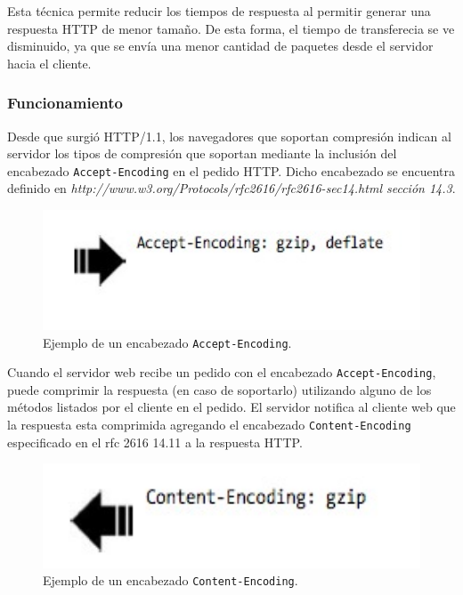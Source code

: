 \documentclass[a4paper,12pt]{report}
\begin{document}
Esta técnica permite reducir los tiempos de respuesta al permitir generar una respuesta HTTP de menor tamaño. De esta forma, el tiempo de transferecia se ve disminuido, ya que se envía
una menor cantidad de paquetes desde el servidor hacia el cliente.

\subsubsection{Funcionamiento}

Desde que surgió HTTP/1.1, los navegadores que soportan compresión indican al servidor los tipos de compresión que soportan mediante la inclusión del encabezado
\texttt{Accept-Encoding} en el pedido HTTP. Dicho encabezado se encuentra definido en \emph{http://www.w3.org/Protocols/rfc2616/rfc2616-sec14.html sección 14.3}.

\begin{figure}[h]
\centering
\includegraphics[width=1\textwidth]{figuras/hpws/accept-encoding.jpg}
  \caption{Ejemplo de un encabezado \texttt{Accept-Encoding}.}
    \label{fig.gzip-request}
\end{figure}

Cuando el servidor web recibe un pedido con el encabezado \texttt{Accept-Encoding}, puede comprimir la respuesta (en caso de soportarlo) utilizando alguno de los métodos listados
por el cliente en el pedido. El servidor notifica al cliente web que la respuesta esta comprimida agregando el encabezado \texttt{Content-Encoding} especificado en el rfc 2616
\cite{rfc2616} 14.11 a la respuesta HTTP.

\begin{figure}[h]
\centering
\includegraphics[width=1\textwidth]{figuras/hpws/content-encoding.jpg}
  \caption{Ejemplo de un encabezado \texttt{Content-Encoding}.}
    \label{fig.gzip-respuest}
\end{figure}
\end{document}
